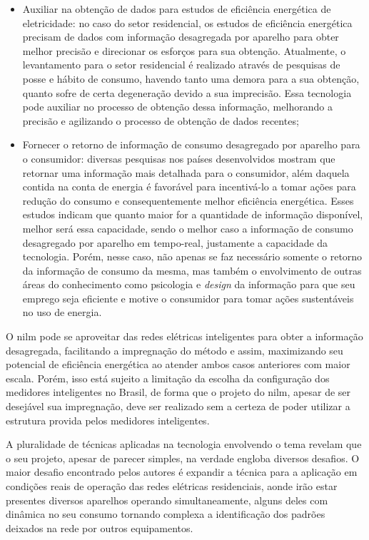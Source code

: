 \begin{itemize}
\item Auxiliar na obtenção de dados para estudos de eficiência
energética de eletricidade: no caso do setor residencial, os estudos
de eficiência energética precisam de dados com informação desagregada
por aparelho para obter melhor precisão e direcionar os esforços para
sua obtenção. Atualmente, o levantamento para o setor residencial é
realizado através de pesquisas de posse e hábito de consumo, havendo
tanto uma demora para a sua obtenção, quanto sofre de certa degeneração
devido a sua imprecisão. Essa tecnologia pode auxiliar no processo de
obtenção dessa informação, melhorando a precisão e agilizando o
processo de obtenção de dados recentes;
\item Fornecer o retorno de informação de consumo desagregado por
aparelho para o consumidor: diversas pesquisas nos países
desenvolvidos mostram que retornar uma informação mais detalhada para
o consumidor, além daquela contida na conta de energia é favorável
para incentivá-lo a tomar ações para redução do consumo e
consequentemente melhor eficiência energética. Esses
estudos indicam que quanto maior for a quantidade de informação
disponível, melhor será essa capacidade, sendo o melhor caso a
informação de consumo desagregado por aparelho em tempo-real,
justamente a capacidade da tecnologia. Porém, nesse caso, não apenas se
faz necessário somente o retorno da informação de consumo da mesma,
mas também o envolvimento de outras áreas do conhecimento como
psicologia e \emph{design} da informação para que seu emprego seja
eficiente e motive o consumidor para tomar ações sustentáveis no uso
de energia.
\end{itemize}

O \acs{nilm} pode se aproveitar das redes elétricas inteligentes para
obter a informação desagregada, facilitando a impregnação do método e
assim, maximizando seu potencial de eficiência energética ao atender
ambos casos anteriores com maior escala. Porém, isso está sujeito a limitação
da escolha da configuração dos medidores inteligentes no Brasil, de
forma que o projeto do \acs{nilm}, apesar de ser desejável sua
impregnação, deve ser realizado sem a certeza de poder utilizar a
estrutura provida pelos medidores inteligentes.

A pluralidade de técnicas aplicadas na tecnologia envolvendo o tema
revelam que o seu projeto, apesar de parecer simples, na verdade
engloba diversos desafios. O maior desafio encontrado pelos autores é
expandir a técnica para a aplicação em condições reais de operação das
redes elétricas residenciais, aonde irão estar presentes diversos
aparelhos operando simultaneamente, alguns deles com dinâmica no seu
consumo tornando complexa a identificação dos padrões deixados na rede
por outros equipamentos.

